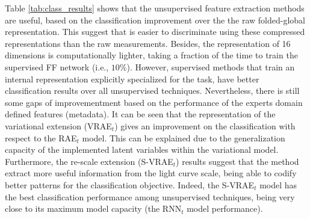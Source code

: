 Table \ref{tab:class_results} shows that the unsupervised feature extraction methods are useful, based on the classification improvement over the the raw folded-global representation. This suggest that is easier to discriminate using these compressed representations than the raw measurements. Besides, the representation of 16 dimensions is computationally lighter, taking a fraction of the time to train the supervised FF network (i.e., $10\%$).
However, supervised methods that train an internal representation explicitly specialized for the task, have better classification results over all unsupervised techniques. Nevertheless, there is still some gaps of improvementment based on the performance of the experts domain defined features (metadata).
It can be seen that the representation of the variational extension (VRAE$_t$) gives an improvement on the classification with respect to the RAE$_t$ model. This can be explained due to the generalization capacity of the implemented latent variables within the variational model. 
Furthermore, the re-scale extension (S-VRAE$_t$) results suggest that the method extract more useful information from the light curve scale, being able to codify better patterns for the classification objective. Indeed, the S-VRAE$_t$ model has the best classification performance among unsupervised techniques, being very close to its maximum model capacity (the RNN$_t$ model performance).




